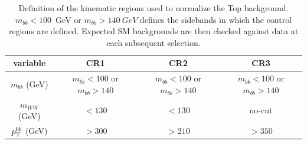 \begin{table}
\begin{center}
\begin{tabular}{c|c|c|c|}
 variable 						&CR1 				& CR2 	& CR3 \\
\hline					
$m_{bb}$ (GeV)						& $m_{bb} < 100$ or $m_{bb} > 140$ & $m_{bb} < 100$ or $m_{bb} > 140$ & $m_{bb} < 100$ or $m_{bb} > 140$\\
$m_{WW}$ (GeV)   				& $<130$ 		 		& $<130$		& no-cut \\
$p_{\rm T}^{bb}$ (GeV) 			& $>300$ 		 		& $>210$		&$>350$\\
\hline


\end{tabular}
\caption[Definition of the kinematic regions used to normalize the Top background]{Definition of the kinematic regions used to normalize the Top background. $m_{bb} < 100$~GeV or $m_{bb} > 140~GeV$ defines the sidebands in which the control regions are defined. Expected SM backgrounds are then checked against data at each subsequent selection.} \label{tab:CRdef}
\end{center}
\end{table}

